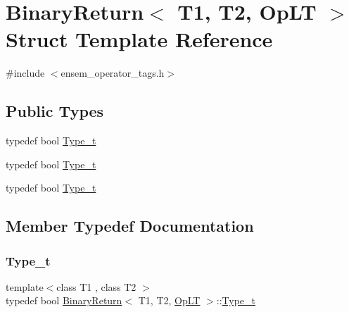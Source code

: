 \hypertarget{structBinaryReturn_3_01T1_00_01T2_00_01OpLT_01_4}{}\section{Binary\+Return$<$ T1, T2, Op\+LT $>$ Struct Template Reference}
\label{structBinaryReturn_3_01T1_00_01T2_00_01OpLT_01_4}


{\ttfamily \#include $<$ensem\+\_\+operator\+\_\+tags.\+h$>$}

\subsection*{Public Types}
\begin{DoxyCompactItemize}
\item 
typedef bool \mbox{\hyperlink{structBinaryReturn_3_01T1_00_01T2_00_01OpLT_01_4_a81d2cdfa9ce7378eebb7619141857f6d}{Type\+\_\+t}}
\item 
typedef bool \mbox{\hyperlink{structBinaryReturn_3_01T1_00_01T2_00_01OpLT_01_4_a81d2cdfa9ce7378eebb7619141857f6d}{Type\+\_\+t}}
\item 
typedef bool \mbox{\hyperlink{structBinaryReturn_3_01T1_00_01T2_00_01OpLT_01_4_a81d2cdfa9ce7378eebb7619141857f6d}{Type\+\_\+t}}
\end{DoxyCompactItemize}


\subsection{Member Typedef Documentation}
\mbox{\label{structBinaryReturn_3_01T1_00_01T2_00_01OpLT_01_4_a81d2cdfa9ce7378eebb7619141857f6d}} 
\subsubsection{\texorpdfstring{Type\_t}{Type\_t}\hspace{0.1cm}{\footnotesize\ttfamily [1/3]}}
{\footnotesize\ttfamily template$<$class T1 , class T2 $>$ \\
typedef bool \mbox{\hyperlink{structBinaryReturn}{Binary\+Return}}$<$ T1, T2, \mbox{\hyperlink{structOpLT}{Op\+LT}} $>$\+::\mbox{\hyperlink{structBinaryReturn_3_01T1_00_01T2_00_01OpLT_01_4_a81d2cdfa9ce7378eebb7619141857f6d}{Type\+\_\+t}}}

